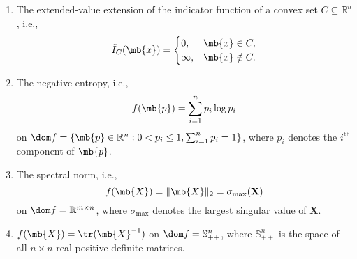 \begin{exercise}
\begin{enumerate}
\begin{enumerate}
        \item The extended-value extension of the indicator function of a convex set $C\subseteq\mathbb{R}^n$, i.e.,
          \begin{align*}
            \tilde{I}_C(\mb{x})=
            \begin{cases}
              0,      & \mb{x}\in C,     \\
              \infty, & \mb{x}\notin C.
            \end{cases}
          \end{align*}
          
        \item
          The negative entropy, i.e.,
          $$
            f(\mb{p})=\sum_{i=1}^n p_i\log p_i
          $$
          on $\dom f=\{ \mb{p}\in\mathbb{R}^n:0<p_i\le 1, \sum_{i=1}^n p_i=1\}$, where $p_i$ denotes the $i^{\text{th}}$ component of $\mb{p}$.
          
        \item
          The spectral norm, i.e.,
          $$
            f(\mb{X})=\|\mb{X}\|_2=\sigma_{\max}(\textbf{X})
          $$
          on $\dom f=\mathbb{R}^{m\times n}$,
          where $\sigma_{\max}$ denotes the largest singular value of $\textbf{X}$.
          
        \item
          $f(\mb{X})=\tr (\mb{X}^{-1})$ on $\dom f=\mathbb{S}_{++}^n$, where $\mathbb{S}_{++}^n$ is the space of all $n\times n$ real positive definite matrices.
          
      \end{enumerate}
      

\end{enumerate}
\end{exercise}
